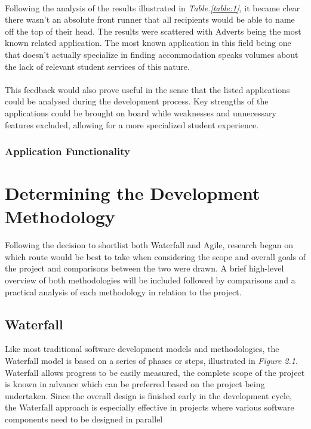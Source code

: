 \paragraph{}
Following the analysis of the results illustrated in \textit{Table.\ref{table:1}}, it became clear there wasn't an absolute front runner that all recipients would be able to name off the top of their head. The results were scattered with Adverts being the most known related application. The most known application in this field being one that doesn't actually specialize in finding accommodation speaks volumes about the lack of relevant student services of this nature.

\paragraph{}
This feedback would also prove useful in the sense that the listed applications could be analysed during the development process. Key strengths of the applications could be brought on board while weaknesses and unnecessary features excluded, allowing for a more specialized student experience.

\subsubsection{Application Functionality}


\section{Determining the Development Methodology}
Following the decision to shortlist both Waterfall and Agile, research began on which route would be best to take when considering the scope and overall goals of the project and comparisons between the two were drawn. A brief high-level overview of both methodologies will be included followed by comparisons and a practical analysis of each methodology in relation to the project.

\subsection{Waterfall}
Like most traditional software development models and methodologies, the Waterfall model is based on a series of phases or steps, illustrated in \textit{Figure 2.1}. Waterfall allows progress to be easily measured, the complete scope of the project is known in advance which can be preferred based on the project being undertaken. Since the overall design is finished early in the development cycle, the Waterfall approach is especially effective in projects where various software components need to be designed in parallel \cite{WATERFALL_SURVEY} 

